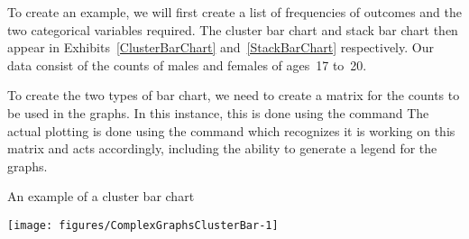To create an example, we will first create a list of frequencies of outcomes and the two categorical variables required. The cluster bar chart and stack bar chart then appear in Exhibits~\ref{ClusterBarChart} and~\ref{StackBarChart} respectively. Our data consist of the counts of males and females of ages~17 to~20. 
\begin{knitrout}
\color{fgcolor}\begin{kframe}
\begin{alltt}
\hlstd{> }\hlkwb{=}\hlstd{(}\hlstd{,}\hlstd{,} \hlstd{,} \hlstd{,} \hlstd{,}\hlstd{,} \hlstd{,} \hlstd{)}
\hlstd{> }\hlkwb{=}\hlstd{(}\hlstd{(}\hlstd{,} \hlstd{),} \hlstd{)}
\hlstd{> }\hlkwb{=}\hlstd{(}\hlstd{(}\hlstd{,}\hlstd{,}\hlstd{,}\hlstd{),} \hlstd{=}\hlstd{)}
\end{alltt}
\end{kframe}
\end{knitrout}
To create the two types of bar chart, we need to create a matrix for the counts to be used in the graphs. In this instance, this is done using the  command The actual plotting is done using the  command which recognizes it is working on this matrix and acts accordingly, including the ability to generate a legend for the graphs. 
\begin{exhibit} 
\begin{center} 
\caption{An example of a cluster bar chart} 
\label{ClusterBarChart} 
\begin{knitrout}
\color{fgcolor}\begin{kframe}
\begin{alltt}
\hlstd{> }\hlstd{(}  \hlstd{=}\hlstd{(}\hlstd{,}\hlstd{),} \hlstd{=}\hlstd{,} \hlstd{=}\hlstd{)}
\hlstd{> }\hlstd{(}\hlstd{,} \hlstd{=}\hlstd{,} \hlstd{=}\hlstd{)}
\end{alltt}
\end{kframe}
\texttt{[image: figures/ComplexGraphsClusterBar-1]} 

\end{knitrout}
\end{center} 
\end{exhibit} 
